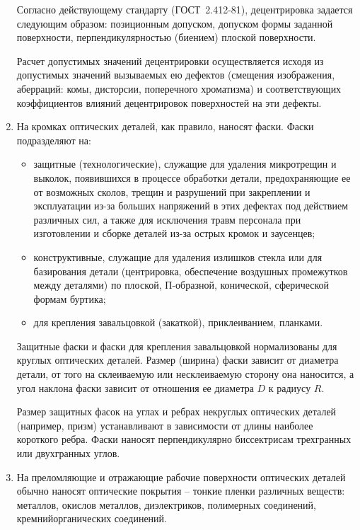 \begin{enumerate}
	Согласно действующему стандарту (ГОСТ~2.412-81), децентрировка задается следующим образом: позиционным допуском, допуском формы заданной поверхности, перпендикулярностью (биением) плоской поверхности.
	
	Расчет допустимых значений децентрировки осуществляется исходя из допустимых значений вызываемых ею дефектов (смещения изображения, аберраций: комы, дисторсии, поперечного хроматизма) и соответствующих коэффициентов влияний децентрировок поверхностей на эти дефекты.
	\item На кромках оптических деталей, как правило, наносят фаски. Фаски подразделяют на:
	\begin{itemize}
		\item защитные (технологические), служащие для удаления микротрещин и выколок, появившихся в процессе обработки детали, предохраняющие ее от возможных сколов, трещин и разрушений при закреплении и эксплуатации из-за больших напряжений в этих дефектах под действием различных сил, а также для исключения травм персонала при изготовлении и сборке деталей из-за острых кромок и заусенцев;
		\item конструктивные, служащие для удаления излишков стекла или для базирования детали (центрировка, обеспечение воздушных промежутков между деталями) по плоской, П-образной, конической, сферической формам буртика;
		\item для крепления завальцовкой (закаткой), приклеиванием, планками.
	\end{itemize}
	
	Защитные фаски и фаски для крепления завальцовкой нормализованы для круглых оптических деталей. Размер (ширина) фаски зависит от диаметра детали, от того на склеиваемую или несклеиваемую сторону она наносится, а угол наклона фаски зависит от отношения ее диаметра $D$ к радиусу $R$.
	
	Размер защитных фасок на углах и ребрах некруглых оптических деталей (например, призм) устанавливают в зависимости от длины наиболее короткого ребра. Фаски наносят перпендикулярно биссектрисам трехгранных или двухгранных углов.
	
	\item На преломляющие и отражающие рабочие поверхности оптических деталей обычно наносят оптические покрытия -- тонкие пленки различных веществ: металлов, окислов металлов, диэлектриков, полимерных соединений, кремнийорганических соединений.
	

\end{enumerate}
